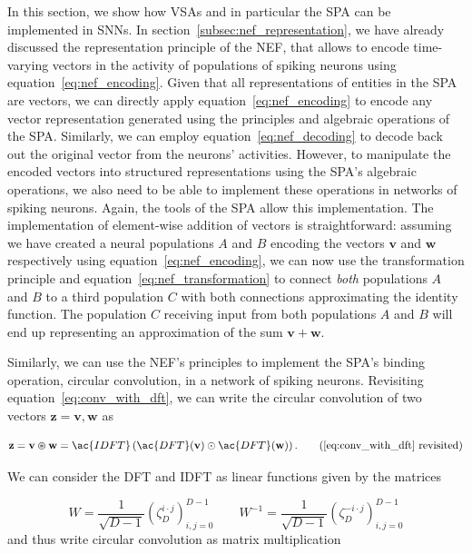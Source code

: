 In this section, we show how \acp{VSA} and in particular the \ac{SPA} can be implemented in \acp{SNN}.
In section~\ref{subsec:nef_representation}, we have already discussed the representation principle of the \ac{NEF}, that allows to encode time-varying vectors in the activity of populations of spiking neurons using equation~\eqref{eq:nef_encoding}.
Given that all representations of entities in the \ac{SPA} are vectors, we can directly apply equation~\eqref{eq:nef_encoding} to encode any vector representation generated using the principles and algebraic operations of the \ac{SPA}.
Similarly, we can employ equation~\eqref{eq:nef_decoding} to decode back out the original vector from the neurons' activities.
However, to manipulate the encoded vectors into structured representations using the \ac{SPA}'s algebraic operations, we also need to be able to implement these operations in networks of spiking neurons.
Again, the tools of the \ac{SPA} allow this implementation.
The implementation of element-wise addition of vectors is straightforward: assuming we have created a neural populations $A$ and $B$ encoding the vectors $ \mathbf{v}$ and $ \mathbf{w}$ respectively using equation~\eqref{eq:nef_encoding}, we can now use the transformation principle and equation~\eqref{eq:nef_transformation} to connect \emph{both} populations $A$ and $B$ to a third population $C$ with both connections approximating the identity function.
The population $C$ receiving input from both populations $A$ and $B$ will end up representing an approximation of the sum $ \mathbf{v}+ \mathbf{w}$.

Similarly, we can use the \ac{NEF}'s principles to implement the \ac{SPA}'s binding operation, circular convolution, in a network of spiking neurons.
Revisiting equation~\eqref{eq:conv_with_dft}, we can write the circular convolution of two vectors $ \mathbf{z} = \mathbf{v}, \mathbf{w}$ as

\begin{equation}
    \mathbf{z} = \mathbf{v} \varoast \mathbf{w} = \ac{IDFT}\left(\ac{DFT}( \mathbf{v}) \odot \ac{DFT}( \mathbf{w}) \right). \tag{\ref{eq:conv_with_dft} revisited}
\end{equation}

We can consider the \ac{DFT} and \ac{IDFT} as linear functions given by the matrices

\begin{equation}
\label{eq:dft_mat}
W = \frac{1}{ \sqrt{D-1}} \left(\zeta_{D} ^{i\cdot j}\right)_{i,j=0}^{D-1} \qquad
W^{-1} = \frac{1}{ \sqrt{D-1}} \left(\zeta_{D} ^{-i\cdot j}\right)_{i,j=0}^{D-1}
\end{equation}
and thus write circular convolution as matrix multiplication

